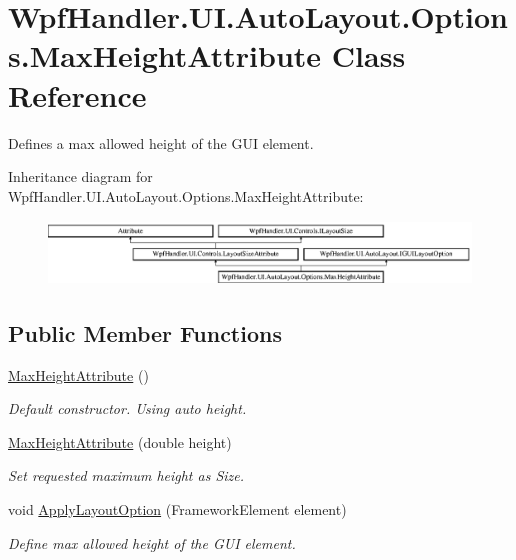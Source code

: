 \hypertarget{class_wpf_handler_1_1_u_i_1_1_auto_layout_1_1_options_1_1_max_height_attribute}{}\section{Wpf\+Handler.\+U\+I.\+Auto\+Layout.\+Options.\+Max\+Height\+Attribute Class Reference}
\label{class_wpf_handler_1_1_u_i_1_1_auto_layout_1_1_options_1_1_max_height_attribute}


Defines a max allowed height of the G\+UI element.  


Inheritance diagram for Wpf\+Handler.\+U\+I.\+Auto\+Layout.\+Options.\+Max\+Height\+Attribute\+:\begin{figure}[H]
\begin{center}
\leavevmode
\includegraphics[height=1.707317cm]{d8/d31/class_wpf_handler_1_1_u_i_1_1_auto_layout_1_1_options_1_1_max_height_attribute}
\end{center}
\end{figure}
\subsection*{Public Member Functions}
\begin{DoxyCompactItemize}
\item 
\mbox{\hyperlink{class_wpf_handler_1_1_u_i_1_1_auto_layout_1_1_options_1_1_max_height_attribute_af8c796ee4a1ea70d91249014f9c59117}{Max\+Height\+Attribute}} ()
\begin{DoxyCompactList}\small\item\em Default constructor. Using auto height. \end{DoxyCompactList}\item 
\mbox{\hyperlink{class_wpf_handler_1_1_u_i_1_1_auto_layout_1_1_options_1_1_max_height_attribute_af504388049b3db7acbc4e0a340014127}{Max\+Height\+Attribute}} (double height)
\begin{DoxyCompactList}\small\item\em Set requested maximum height as Size. \end{DoxyCompactList}\item 
void \mbox{\hyperlink{class_wpf_handler_1_1_u_i_1_1_auto_layout_1_1_options_1_1_max_height_attribute_a1b1d850c2c5d8e59454d7f9b5271ee88}{Apply\+Layout\+Option}} (Framework\+Element element)
\begin{DoxyCompactList}\small\item\em Define max allowed height of the G\+UI element. \end{DoxyCompactList}\end{DoxyCompactItemize}
